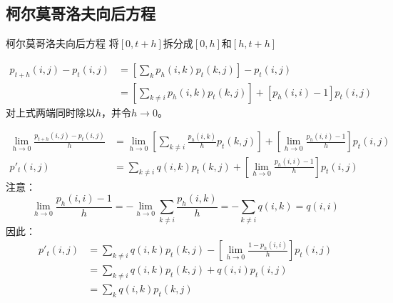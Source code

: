 \documentclass[t]{beamer}
\begin{document}
\subsection{柯尔莫哥洛夫向后方程}
\begin{frame}{柯尔莫哥洛夫向后方程}
  将$[0,t+h]$拆分成$[0,h]$和$[h,t+h]$
\begin{center}
\end{center}
\[\begin{split}
  p_{t+h}(i,j)-p_t(i,j)&=\left[\sum_kp_h(i,k)p_t(k,j) \right]-p_t(i,j)\\
  &=\left[\sum_{k\ne i}p_h(i,k)p_t(k,j) \right]+\left[p_h(i,i)-1\right]p_t(i,j)
  \end{split}
   \]
   对上式两端同时除以$h$，并令$h\to 0$。
\end{frame}


\begin{frame}{}\small
  \[\begin{split}
    {\lim_{h\to 0}\frac{p_{t+h}(i,j)-p_t(i,j)}{h}}&={\lim_{h\to 0}}\left[{\sum_{k\ne i}\frac{p_h(i,k)}{h}}p_t(k,j) \right]+\left[\lim_{h\to 0}\frac{p_h(i,i)-1}{h}\right]p_t(i,j)\\
    {p'_t(i,j)}&={\sum_{k\ne i}q(i,k)}p_t(k,j)+\left[\lim_{h\to 0}\frac{p_h(i,i)-1}{h}\right]p_t(i,j)
    \end{split}  \]
    注意：
    \[ \lim_{h\to 0}\frac{p_h(i,i)-1}{h}=-\lim_{h\to 0}\sum_{k\ne i}\frac{p_h(i,k)}{h}=-\sum_{k\ne i} q(i,k)=q(i,i) \]
    因此：
    \[\begin{split}
    p'_t(i,j)&=\sum_{k\ne i}q(i,k)p_t(k,j)-{\left[\lim_{h\to 0}\frac{1-p_h(i,i)}{h}\right]}p_t(i,j)\\
    &=\sum_{k\ne i}q(i,k)p_t(k,j)+q(i,i) p_t(i,j)\\
    &=\sum_k q(i,k)p_t(k,j)
    \end{split} \]	\end{frame}
\end{document}
